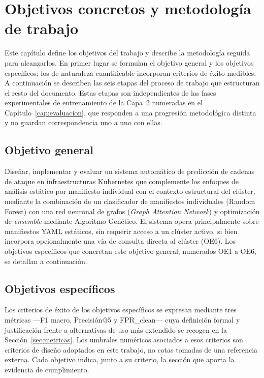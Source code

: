 \chapter{Objetivos concretos y metodología de trabajo}
\label{cap:objetivos}

Este capítulo define los objetivos del trabajo y describe la metodología seguida
para alcanzarlos. En primer lugar se formulan el objetivo general y los objetivos
específicos; los de naturaleza cuantificable incorporan criterios de éxito
medibles. A continuación se describen las seis etapas del proceso de trabajo
que estructuran el resto del documento. Estas etapas son independientes de las
fases experimentales de entrenamiento de la Capa~2 numeradas en el
Capítulo~\ref{cap:evaluacion}, que responden a una progresión metodológica
distinta y no guardan correspondencia uno a uno con ellas.

\section{Objetivo general}

Diseñar, implementar y evaluar un sistema automático de predicción de cadenas de
ataque en infraestructuras Kubernetes que complemente los enfoques de
análisis estático por manifiesto individual con el contexto estructural del
clúster, mediante la combinación de un clasificador de manifiestos individuales
(Random Forest) con una red neuronal de grafos (\textit{Graph Attention
Network}) y optimización de \textit{ensemble} mediante Algoritmo Genético. El sistema opera
principalmente sobre manifiestos \acs{YAML} estáticos, sin requerir acceso a un
clúster activo, si bien incorpora opcionalmente una vía de consulta directa al
clúster (OE6). Los objetivos específicos que concretan este objetivo general,
numerados OE1 a OE6, se detallan a continuación.

\section{Objetivos específicos}

Los criterios de éxito de los objetivos específicos se expresan mediante tres
métricas —F1 macro, Precisión@5 y \ac{FPR}\_clean— cuya definición formal y
justificación frente a alternativas de uso más extendido se recogen en la
Sección~\ref{sec:metricas}. Los umbrales numéricos asociados a esos criterios son
criterios de diseño adoptados en este trabajo, no cotas tomadas de una referencia
externa. Cada objetivo indica, junto a su criterio, la sección que aporta la
evidencia de cumplimiento.

